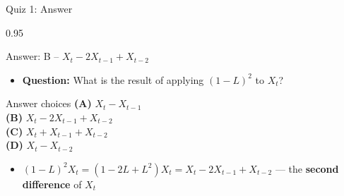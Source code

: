\documentclass[9pt, aspectratio=169, t]{beamer}
\begin{document}
\begin{frame}{Quiz 1: Answer}
    \begin{cminipage}{0.95\textwidth}
    \begin{exampleblock}{Answer: B -- $X_t - 2X_{t-1} + X_{t-2}$}
        \begin{itemize}\setlength{\itemsep}{0pt}
            \item \textbf{Question:} What is the result of applying $(1-L)^2$ to $X_t$?
        \end{itemize}

        \vspace{0.3cm}

    \begin{block}{Answer choices}
        \textcolor{MainBlue}{\textbf{(A)}} $X_t - X_{t-1}$ \incorrect\\[3pt]
        \textcolor{MainBlue}{\textbf{(B)}} \textbf{\textcolor{Forest}{$X_t - 2X_{t-1} + X_{t-2}$}} \correct\\[3pt]
        \textcolor{MainBlue}{\textbf{(C)}} $X_t + X_{t-1} + X_{t-2}$ \incorrect\\[3pt]
        \textcolor{MainBlue}{\textbf{(D)}} $X_t - X_{t-2}$ \incorrect
    \end{block}

        \vspace{0.3cm}

        \begin{itemize}
            \item $(1-L)^2 X_t = (1 - 2L + L^2)X_t = X_t - 2X_{t-1} + X_{t-2}$ --- the \textbf{second difference} of $X_t$
        \end{itemize}
    \end{exampleblock}

    \end{cminipage}
\end{frame}
\end{document}

